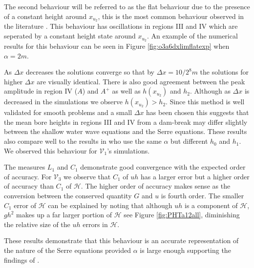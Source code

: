 \documentclass[SingleSpace,12pt,Proceedings]{Serre_ASCE}
\begin{document}
The second behaviour will be referred to as the flat behaviour due to the presence of a constant height around $x_{u_2}$, this is the most common behaviour observed in the literature \cite{Hank-etal-2010-2034,Dutykh-2014-315,Mitsotakis-etal-2014}. This behaviour has oscillations in regions III and IV which are seperated by a constant height state around $x_{u_2}$. An example of the numerical results for this behaviour can be seen in Figure \ref{fig:o3a6dxlimflatexp} when $\alpha = 2m$.

As $\Delta x$ decreases the solutions converge so that by $\Delta x = 10 / 2^8m$ the solutions for higher $\Delta x$ are visually identical. There is also good agreement between the peak amplitude in region IV ($A$) and $A^+$ as well as $h(x_{u_2})$ and $h_2$. Although as $\Delta x$ is decreased in the simulations we observe $h(x_{u_2}) > h_2$. Since this method is well validated for smooth problems and a small $\Delta x$ has been chosen this suggests that the mean bore heights in regions III and IV from a dam-break may differ slightly between the shallow water wave equations and the Serre equations. These results also compare well to the results in  who use the same $\alpha$ but different $h_0$ and $h_1$. We observed this behaviour for $\mathcal{V}_1$'s simulations.

The measures $L_1$ and $C_1$ demonstrate good convergence with the expected order of accuracy. For $\mathcal{V}_3$ we observe that $C_1$ of $uh$ has a larger error but a higher order of accuracy than $C_1$ of $\mathcal{H}$. The higher order of accuracy makes sense as the conversion between the conserved quantity $G$ and $u$ is fourth order. The smaller $C_1$ error of $\mathcal{H}$ can be explained by noting that although $uh$ is a component of $\mathcal{H}$, $gh^2$ makes up a far larger portion of $\mathcal{H}$ see Figure \ref{fig:PHTa12all}, diminishing the relative size of the $uh$ errors in $\mathcal{H}$.

These results demonstrate that this behaviour is an accurate representation of the nature of the Serre equations provided $\alpha$ is large enough supporting the findings of .
\end{document}
